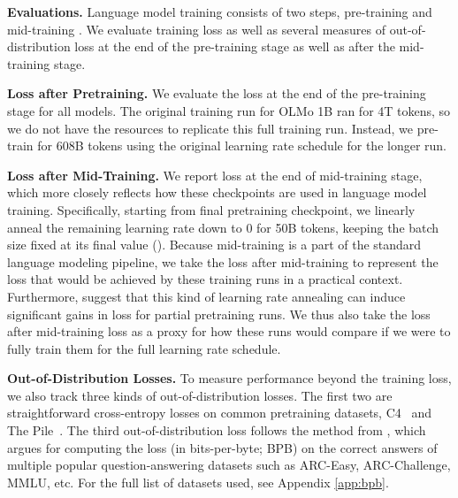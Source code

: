 \documentclass{article}
\renewcommand{\paragraph}[1]{\noindent \textbf{#1}}
\begin{document}
\paragraph{Evaluations.} Language model training consists of two steps, pre-training and mid-training \citep{olmo20252olmo2furious}. We evaluate training loss as well as several measures of out-of-distribution loss at the end of the pre-training stage as well as after the mid-training stage.
\begin{compactitem}
    \item \textbf{Loss after Pretraining.} We evaluate the loss at the end of the pre-training stage for all models. 
    The original training run for OLMo 1B ran for 4T tokens, so we do not have the resources to replicate this full training run.
    Instead, we pre-train for 608B tokens using the original learning rate schedule for the longer run.
    \item \textbf{Loss after Mid-Training.}
    We report loss at the end of mid-training stage, which more closely reflects how these checkpoints are used in language model training. %
    Specifically, starting from final pretraining checkpoint, we linearly anneal the remaining learning rate down to 0 for 50B tokens, keeping the batch size fixed at its final value ().
    Because mid-training is a part of the standard language modeling pipeline, we take the loss after mid-training to represent the loss that would be achieved by these training runs in a practical context.
    Furthermore, \citet{olmo20252olmo2furious} suggest that this kind of learning rate annealing can induce significant gains in loss for partial pretraining runs.
    We thus also take the loss after mid-training loss as a proxy for how these runs would compare if we were to fully train them for the full learning rate schedule.

    \item \textbf{Out-of-Distribution Losses.}
    To measure performance beyond the training loss, we also track three kinds of out-of-distribution losses.
    The first two are straightforward cross-entropy losses on common pretraining datasets, C4~\citep{C4} and The Pile~\citep{Pile}.
    The third out-of-distribution loss follows the method from \cite{Bhagia2024EstablishingTS}, which argues for computing the loss (in bits-per-byte; BPB) on the correct answers of multiple popular question-answering datasets such as ARC-Easy, ARC-Challenge, MMLU, etc. For the full list of datasets used, see Appendix \ref{app:bpb}.
\end{compactitem}
\end{document}
